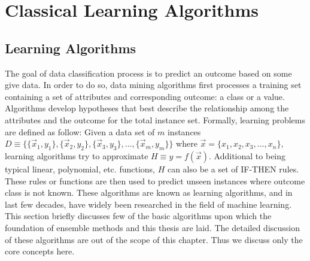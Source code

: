 \clearpage

\chapter{Classical Learning Algorithms}
\label{appndx:cla}

\section*{Learning Algorithms}
The goal of data classification process is to predict an outcome based on some give data. In order to do so, data mining algorithms first processes a training set containing a set of attributes and corresponding outcome: a class or a value. Algorithms develop hypotheses that best describe the relationship among the attributes and the outcome for the total instance set.  Formally, learning problems are defined as follow: Given a data set of $m$ instances  $D \equiv \{ \{\vec{x}_1, y_1\}, \{\vec{x}_2, y_2\}, \{\vec{x}_3, y_3\}, \dots, \{\vec{x}_m, y_m\} \}$ where $ \vec{x} = \{x_1, x_2, x_3, \dots, x_n\}$, learning algorithms try to approximate $H \equiv y = f(\vec{x})$. Additional to being typical linear, polynomial, etc. functions, $H$ can also be a set of IF-THEN rules. These rules or functions are then used to predict unseen instances where outcome class is not known. These algorithms are known as learning algorithms, and in last few decades, have widely been researched in the field of machine learning. This section briefly discusses few of the basic algorithms upon which the foundation of ensemble methods and this thesis are laid. The detailed discussion of these algorithms are out of the scope of this chapter. Thus we discuss only the core concepts here.

